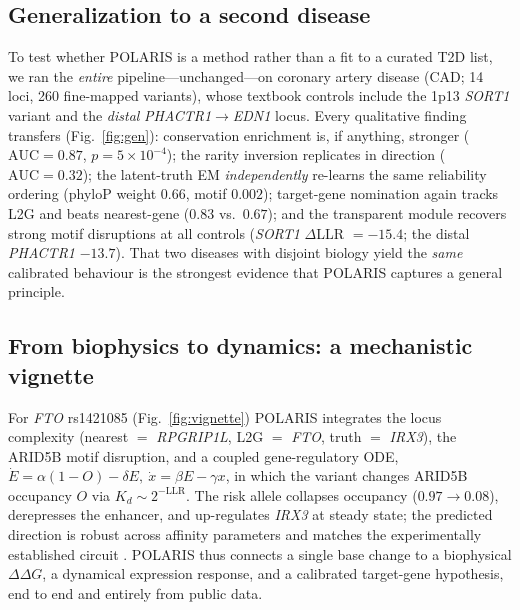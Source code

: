 \documentclass[10pt]{article}
\begin{document}
\subsection{Generalization to a second disease}
To test whether POLARIS is a method rather than a fit to a curated T2D list, we ran the \emph{entire}
pipeline---unchanged---on coronary artery disease (CAD; 14 loci, 260 fine-mapped variants), whose textbook
controls include the 1p13 \emph{SORT1} variant and the \emph{distal} \emph{PHACTR1}$\rightarrow$\emph{EDN1}
locus. Every qualitative finding transfers (Fig.~\ref{fig:gen}): conservation enrichment is, if anything,
stronger ($\mathrm{AUC}=0.87$, $p=5\times10^{-4}$); the rarity inversion replicates in direction
($\mathrm{AUC}=0.32$); the latent-truth EM \emph{independently} re-learns the same reliability ordering
(phyloP weight $0.66$, motif $0.002$); target-gene nomination again tracks L2G and beats nearest-gene
($0.83$ vs.\ $0.67$); and the transparent module recovers strong motif disruptions at all controls
(\emph{SORT1} $\Delta$LLR $=-15.4$; the distal \emph{PHACTR1} $-13.7$). That two diseases with disjoint
biology yield the \emph{same} calibrated behaviour is the strongest evidence that POLARIS captures a
general principle.

\subsection{From biophysics to dynamics: a mechanistic vignette}
For \emph{FTO} rs1421085 (Fig.~\ref{fig:vignette}) POLARIS integrates the locus complexity (nearest
$=$ \emph{RPGRIP1L}, L2G $=$ \emph{FTO}, truth $=$ \emph{IRX3}), the ARID5B motif disruption, and a
coupled gene-regulatory ODE, $\dot E=\alpha(1-O)-\delta E,\ \dot x=\beta E-\gamma x$, in which the
variant changes ARID5B occupancy $O$ via $K_d\!\sim\!2^{-\mathrm{LLR}}$. The risk allele collapses
occupancy ($0.97\!\rightarrow\!0.08$), derepresses the enhancer, and up-regulates \emph{IRX3} at steady
state; the predicted direction is robust across affinity parameters and matches the experimentally
established circuit \citep{claussnitzer2015fto}. POLARIS thus connects a single base change to a
biophysical $\Delta\Delta G$, a dynamical expression response, and a calibrated target-gene hypothesis,
end to end and entirely from public data.
\end{document}
